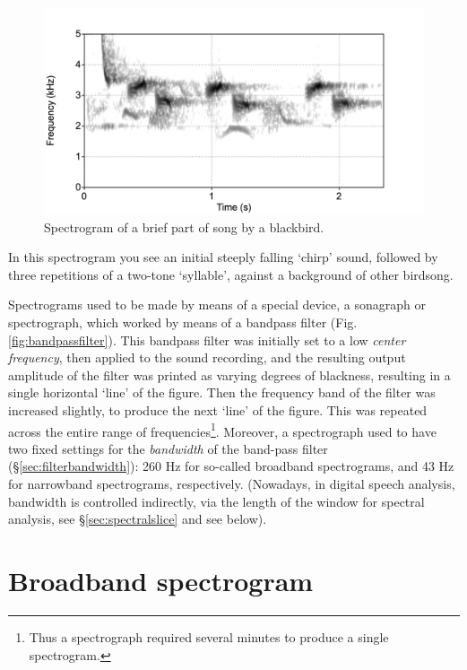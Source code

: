 \documentclass[
]{book}
\begin{document}
\begin{figure}

{\centering \includegraphics{figures/merel-spectrogram} 

}

\caption{Spectrogram of a brief part of song by a blackbird.}\label{fig:merel-spectrogram}
\end{figure}

In this spectrogram you see an initial steeply falling `chirp' sound, followed by three repetitions of a two-tone `syllable', against a background of other birdsong.

Spectrograms used to be made by means of a special device, a sonagraph or spectrograph, which worked by means of a bandpass filter (Fig.\ref{fig:bandpassfilter}). This bandpass filter was initially set to a low \emph{center frequency}, then applied to the sound recording, and the resulting output amplitude of the filter was printed as varying degrees of blackness, resulting in a single horizontal `line' of the figure. Then the frequency band of the filter was increased slightly, to produce the next `line' of the figure. This was repeated across the entire range of frequencies\footnote{Thus a spectrograph required several minutes to produce a single spectrogram.}. Moreover, a spectrograph used to have two fixed settings for the \emph{bandwidth} of the band-pass filter (§\ref{sec:filterbandwidth}): 260 Hz for so-called broadband spectrograms, and 43 Hz for narrowband spectrograms, respectively. (Nowadays, in digital speech analysis, bandwidth is controlled indirectly, via the length of the window for spectral analysis, see §\ref{sec:spectralslice} and see below).

\section{Broadband spectrogram}\label{broadband-spectrogram}
\end{document}
